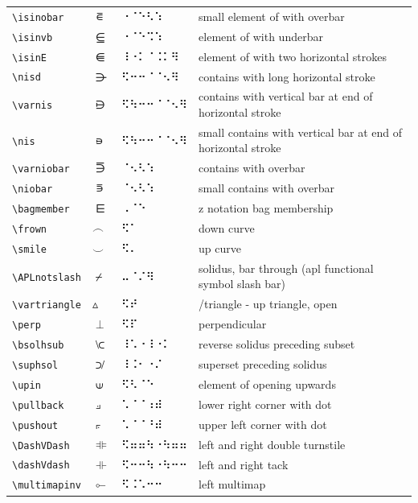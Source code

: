 \documentclass[oneside]{article}
\begin{document}
\begin{longtable}{llll}
\verb|\isinobar| & $\isinobar$ &   ⠐⠈⠑⠣⠱   & {small element of with overbar} \\[2ex]
\verb|\isinvb| & $\isinvb$ &   ⠐⠈⠑⠩⠱   & {element of with underbar} \\[2ex]
\verb|\isinE| & $\isinE$ &   ⠸⠐⠅⠈⠨⠅⠻   & {element of with two horizontal strokes} \\[2ex]
\verb|\nisd| & $\nisd$ &   ⠫⠒⠒⠈⠈⠢⠻   & {contains with long horizontal stroke} \\[2ex]
\verb|\varnis| & $\varnis$ &   ⠫⠳⠒⠒⠈⠈⠢⠻   & {contains with vertical bar at end of horizontal stroke} \\[2ex]
\verb|\nis| & $\nis$ &   ⠫⠳⠒⠒⠈⠈⠢⠻   & {small contains with vertical bar at end of horizontal stroke} \\[2ex]
\verb|\varniobar| & $\varniobar$ &   ⠈⠢⠣⠱   & {contains with overbar} \\[2ex]
\verb|\niobar| & $\niobar$ &   ⠈⠢⠣⠱   & {small contains with overbar} \\[2ex]
\verb|\bagmember| & $\bagmember$ &   ⠠⠈⠑   & {z notation bag membership} \\[2ex]
\verb|\frown| & $\frown$ &   ⠫⠁   & {down curve} \\[2ex]
\verb|\smile| & $\smile$ &   ⠫⠄   & {up curve} \\[2ex]
\verb|\APLnotslash| & $\APLnotslash$ &   ⠤⠈⠌⠻   & {solidus, bar through (apl functional symbol slash bar)} \\[2ex]
\verb|\vartriangle| & $\vartriangle$ &   ⠫⠞   & {/triangle - up triangle, open} \\[2ex]
\verb|\perp| & $\perp$ &   ⠫⠏   & {perpendicular} \\[2ex]
\verb|\bsolhsub| & $\bsolhsub$ &   ⠸⠡⠐⠸⠐⠅   & {reverse solidus preceding subset} \\[2ex]
\verb|\suphsol| & $\suphsol$ &   ⠸⠨⠂⠐⠌   & {superset preceding solidus} \\[2ex]
\verb|\upin| & $\upin$ &   ⠫⠣⠈⠑   & {element of opening upwards} \\[2ex]
\verb|\pullback| & $\pullback$ &   ⠡⠈⠈⠰⠾   & {lower right corner with dot} \\[2ex]
\verb|\pushout| & $\pushout$ &   ⠡⠈⠈⠘⠾   & {upper left corner with dot} \\[2ex]
\verb|\DashVDash| & $\DashVDash$ &   ⠫⠶⠶⠳⠐⠳⠶⠶   & {left and right double turnstile} \\[2ex]
\verb|\dashVdash| & $\dashVdash$ &   ⠫⠒⠒⠳⠐⠳⠒⠒   & {left and right tack} \\[2ex]
\verb|\multimapinv| & $\multimapinv$ &   ⠫⠨⠡⠒⠒   & {left multimap} \\[2ex]

\end{longtable}
\end{document}
